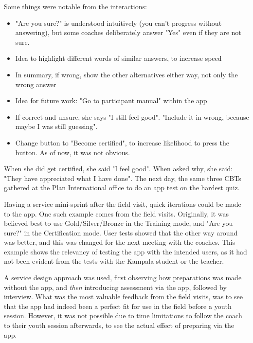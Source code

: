   Some things were notable from the interactions: %
  \begin{itemize}
    \item "Are you sure?" is understood intuitively (you can't progress without answering), but some coaches deliberately answer "Yes" even if they are not sure.
    \item Idea to highlight different words of similar answers, to increase speed
    \item In summary, if wrong, show the other alternatives either way, not only the wrong answer
    \item Idea for future work: "Go to participant manual" within the app %
    \item If correct and unsure, she says "I still feel good". "Include it in wrong, because maybe I was still guessing".
    \item Change button to "Become certified", to increase likelihood to press the button. As of now, it was not obvious.
  \end{itemize}

  When she did get certified, she said "I feel good". When asked why, she said: "They have appreciated what I have done". The next day, the same three CBTs gathered at the Plan International office to do an app test on the hardest quiz.

  Having a service mini-sprint after the field visit, quick iterations could be made to the app. One such example comes from the field visits. Originally, it was believed best to use Gold/Silver/Bronze in the Training mode, and "Are you sure?" in the Certification mode. User tests showed that the other way around was better, and this was changed for the next meeting with the coaches. This example shows the relevancy of testing the app with the intended users, as it had not been evident from the tests with the Kampala student or the teacher.

  A service design approach was used, first observing how preparations was made without the app, and \textit{then} introducing assessment via the app, followed by interview. What was the most valuable feedback from the field visits, was to see that the app had indeed been a perfect fit for use in the field before a youth session. However, it was not possible due to time limitations to follow the coach to their youth session afterwards, to see the actual effect of preparing via the app.
